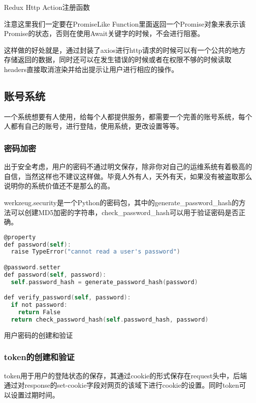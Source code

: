 \begin{center}
	{\small Redux Http Action注册函数}
\end{center}

注意这里我们一定要在PromiseLike Function里面返回一个Promise对象来表示该Promise的状态，否则在使用Await关键字的时候，不会进行阻塞。

这样做的好处就是，通过封装了axios进行http请求的时候可以有一个公共的地方存储返回的数据，同时还可以在发生错误的时候或者在权限不够的时候读取headers直接取消渲染并给出提示让用户进行相应的操作。

\subsection{账号系统}

一个系统想要有人使用，给每个人都提供服务，都需要一个完善的账号系统，每个人都有自己的账号，进行登陆，使用系统，更改设置等等。

\subsubsection{密码加密}

出于安全考虑，用户的密码不通过明文保存，除非你对自己的运维系统有着极高的自信，当然这样也不建议这样做。毕竟人外有人，天外有天，如果没有被盗取那么说明你的系统价值还不是那么的高。

werkzeug.security是一个Python的密码包，其中的generate\_password\_hash的方法可以创建MD5加密的字符串，check\_password\_hash可以用于验证密码是否正确。

\begin{lstlisting}[language=C]
@property
def password(self):
  raise TypeError("cannot read a user's password")

@password.setter
def password(self, password):
  self.password_hash = generate_password_hash(password)

def verify_password(self, password):
  if not password:
    return False
  return check_password_hash(self.password_hash, password)
\end{lstlisting}

\begin{center}
	{\small 用户密码的创建和验证}
\end{center}

\subsubsection{token的创建和验证}

token用于用户的登陆状态的保存，其通过cookie的形式保存在request头中，后端通过对response的set-cookie字段对网页的该域下进行cookie的设置。同时token可以设置过期时间。

